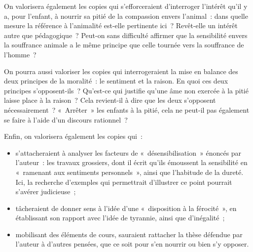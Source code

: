 {On valorisera également les copies qui s'efforceraient d'interroger l'intérêt qu'il
y a, pour l'enfant, à nourrir sa pitié de la compassion envers l'animal~: dans quelle
mesure la référence à l'animalité est-elle pertinente ici~? Revêt-elle un intérêt autre que
pédagogique~? Peut-on sans difficulté affirmer que la sensibilité envers la souffrance
animale a le même principe que celle tournée vers la souffrance de l'homme~?

On pourra aussi valoriser les copies qui interrogeraient la mise en balance des
deux principes de la moralité~: le sentiment et la raison. En quoi ces deux principes
s'opposent-ils~? Qu'est-ce qui justifie qu'une âme non exercée à la pitié laisse place à
la raison~? Cela revient-il à dire que les deux s'opposent nécessairement~? «~Arrêter~»
les enfants à la pitié, cela ne peut-il pas également se faire à l'aide d'un discours
rationnel~?

Enfin, on valorisera également les copies qui~:

\begin{itemize}
\item s'attacheraient à analyser les facteurs de «~désensibilisation~» énoncés par
l'auteur~: les travaux grossiers, dont il écrit qu'ils émoussent la sensibilité en
«~ramenant aux sentiments personnels~», ainsi que l'habitude de la dureté.
Ici, la recherche d'exemples qui permettrait d'illustrer ce point pourrait
s'avérer judicieuse~;

\item tâcheraient de donner sens à l'idée d'une «~disposition à la férocité~», en
établissant son rapport avec l'idée de tyrannie, ainsi que d'inégalité~;

\item mobilisant des éléments de cours, sauraient rattacher la thèse défendue par
l'auteur à d'autres pensées, que ce soit pour s'en nourrir ou bien s'y opposer.
\end{itemize}}%
